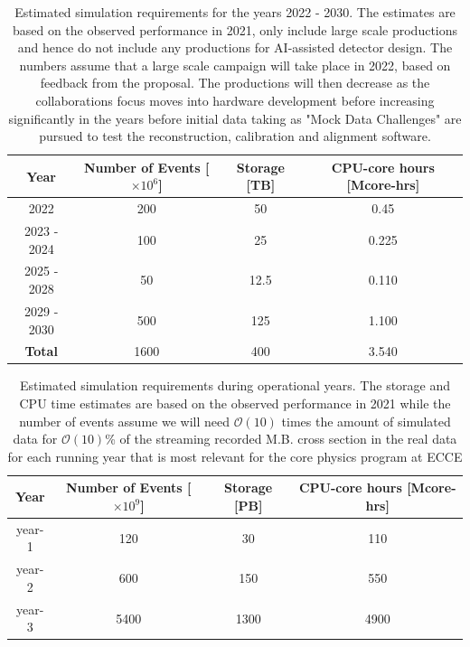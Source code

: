 \begin{table}[!htbp]
	\centering
	\begin{tabular}{c|c|c|c}
		\hline
		Year & Number of Events [$\times 10^{6}$] & Storage [TB] & CPU-core hours [Mcore-hrs] \\
		\hline
		\hline
		2022 & 200 & 50 & 0.45\\
		2023 - 2024 & 100 & 25 & 0.225 \\
		2025 - 2028 & 50 & 12.5 & 0.110 \\
		2029 - 2030 & 500 & 125 & 1.100 \\
		\hline
		\hline
		\textbf{Total} & 1600 & 400 & 3.540 \\
		\hline
	\end{tabular}
	\caption[]{Estimated simulation requirements for the years 2022 - 2030. The estimates are based on the observed performance in 2021, only include large scale productions and hence do not include any productions for AI-assisted detector design. The numbers assume that a large scale campaign will take place in 2022, based on feedback from the proposal. The productions will then decrease as the collaborations focus moves into hardware development before increasing significantly in the years before initial data taking as "Mock Data Challenges" are pursued to test the reconstruction, calibration and alignment software.}
	\label{tab:sim_predictions}
\end{table}

\begin{table}[!htbp]
	\centering
	\begin{tabular}{c|c|c|c}
		\hline
		Year & Number of Events [$\times 10^{9}$] & Storage [PB] & CPU-core hours [Mcore-hrs] \\
		\hline
		\hline
		year-1 & 120 & 30 & 110 \\
		year-2 & 600 & 150 & 550 \\
		year-3 & 5400 & 1300 & 4900 \\
		\hline
	\end{tabular}
	\caption[]{Estimated simulation requirements during operational years. The storage and CPU time estimates are based on the observed performance in 2021 while the number of events assume we will need 
	$\mathcal{O}(10)$ times the amount of simulated data for $\mathcal{O}(10)$\% of the streaming recorded M.B. cross section in the real data for each running year that is most relevant for the core physics program at ECCE
	}
	\label{tab:sim_predictions_data_taking}
\end{table}